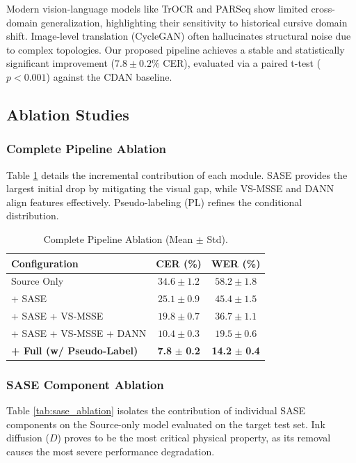 \documentclass[pdflatex,sn-mathphys-num]{sn-jnl}
\begin{document}
Modern vision-language models like TrOCR and PARSeq show limited cross-domain generalization, highlighting their sensitivity to historical cursive domain shift. Image-level translation (CycleGAN) often hallucinates structural noise due to complex topologies. Our proposed pipeline achieves a stable and statistically significant improvement ($7.8 \pm 0.2\%$ CER), evaluated via a paired t-test ($p < 0.001$) against the CDAN baseline.

\subsection{Ablation Studies}

\subsubsection{Complete Pipeline Ablation}
Table \ref{tab:pipeline_ablation} details the incremental contribution of each module. SASE provides the largest initial drop by mitigating the visual gap, while VS-MSSE and DANN align features effectively. Pseudo-labeling (PL) refines the conditional distribution.

\begin{table}[htbp]
\centering
\caption{Complete Pipeline Ablation (Mean $\pm$ Std).}
\label{tab:pipeline_ablation}
\begin{tabular}{l c c}
\toprule
\textbf{Configuration} & \textbf{CER (\%)} & \textbf{WER (\%)} \\
\midrule
Source Only & $34.6 \pm 1.2$ & $58.2 \pm 1.8$ \\
+ SASE & $25.1 \pm 0.9$ & $45.4 \pm 1.5$ \\
+ SASE + VS-MSSE & $19.8 \pm 0.7$ & $36.7 \pm 1.1$ \\
+ SASE + VS-MSSE + DANN & $10.4 \pm 0.3$ & $19.5 \pm 0.6$ \\
\textbf{+ Full (w/ Pseudo-Label)} & \textbf{7.8} $\pm$ \textbf{0.2} & \textbf{14.2} $\pm$ \textbf{0.4} \\
\bottomrule
\end{tabular}
\end{table}

\subsubsection{SASE Component Ablation}
Table \ref{tab:sase_ablation} isolates the contribution of individual SASE components on the Source-only model evaluated on the target test set. Ink diffusion ($D$) proves to be the most critical physical property, as its removal causes the most severe performance degradation.
\end{document}
